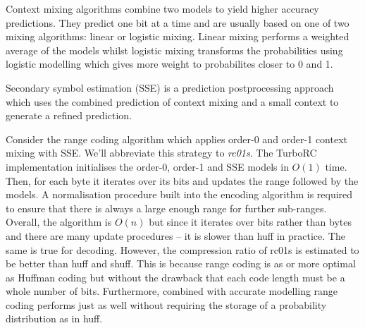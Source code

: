 Context mixing algorithms combine two models to yield higher accuracy
predictions. They predict one bit at a time and are usually based on one of
two mixing algorithms: linear or logistic mixing. Linear mixing performs
a weighted average of the models whilst logistic mixing transforms the
probabilities using logistic modelling which gives more weight to
probabilites closer to 0 and 1.

Secondary symbol estimation (SSE) is a prediction postprocessing approach which
uses the combined prediction of context mixing and a small context to generate a
refined prediction.

Consider the range coding algorithm which applies order-0 and order-1
context mixing with SSE. We'll abbreviate this strategy to \textit{rc01s}. The
TurboRC implementation initialises the order-0, order-1 and SSE models in $O(1)$
time. Then, for each byte it iterates over its bits and updates the range
followed by the models. A normalisation procedure built into the encoding
algorithm is required to ensure that there is always a large enough range for
further sub-ranges. Overall, the algorithm is $O(n)$ but since it iterates over
bits rather than bytes and there are many update procedures -- it is slower than
huff in practice. The same is true for decoding. However, the compression ratio
of rc01s is estimated to be better than huff and shuff. This is because range
coding is as or more optimal as Huffman coding but without the drawback that
each code length must be a whole number of bits. Furthermore, combined with
accurate modelling range coding performs just as well without requiring the
storage of a probability distribution as in huff.

